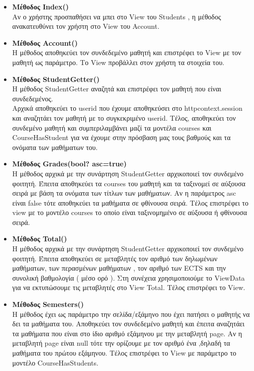 \documentclass[12pt]{article}
\begin{document}
\begin{itemize}
	
	\item \textbf{Μέθοδος Index()}\\				
	Αν ο χρήστης προσπαθήσει να μπει στο View του Students , η μέθοδος ανακατευθύνει τον χρήστη στο View του Account.
	
	\item	\textbf{Μέθοδος Account()}\\
	Η μέθοδος αποθηκεύει τον συνδεδεμένο μαθητή και επιστρέφει το View με τον μαθητή ως παράμετρο. Το View προβάλλει στον χρήστη τα στοιχεία του.
	
	\item \textbf{Μέθοδος StudentGetter()}\\		
	Η μέθοδος StudentGetter αναζητά και επιστρέφει τον μαθητή που είναι συνδεδεμένος.\\
	Αρχικά αποθηκεύει το userid που έχουμε αποθηκεύσει στο httpcontext.session και αναζητάει τον μαθητή με το συγκεκριμένο userid. Τέλος, αποθηκεύει τον συνδεμένο μαθητή και συμπεριλαμβάνει μαζί τα μοντέλα courses και CourseHasStudent για να έχουμε στην πρόσβαση μας τους βαθμούς και τα ονόματα των μαθήματων του.

	\item \textbf{Μέθοδος Grades(bool? asc=true)}\\
	Η μέθοδος αρχικά με την συνάρτηση StudentGetter αρχικοποιεί τον συνδεμένο φοιτητή. Έπειτα αποθηκεύει τα courses του μαθητή και τα ταξινομεί σε αύξουσα σειρά με βάση τα ονόματα των τίτλων των μαθήματων. Αν η παράμετρος asc είναι false τότε αποθηκεύει τα μαθήματα σε φθίνουσα σειρά. Τέλος επιστρέφει το view με το μοντέλο courses το οποίο είναι ταξινομημένο σε αύξουσα ή φθίνουσα σειρά.
		
	\item \textbf{Μέθοδος Total()}\\
	Η μέθοδος αρχικά με την συνάρτηση StudentGetter αρχικοποιεί τον συνδεμένο φοιτητή. Έπειτα αποθηκεύει σε μεταβλητές τον αριθμό των δηλωμένων μαθήματων, των περασμένων μαθήματων , τον αριθμό των ECTS και την συνολική βαθμολογία ( μέσο ορό ). Στη συνέχεια χρησιμοποιούμε το ViewData για να εκτυπώσουμε τις μεταβλητές στο View Total. Τέλος επιστρέφει το View.
	
	\item \textbf{Μέθοδος Semesters()}\\
	Η μέθοδος έχει ως παράμετρο την σελίδα/εξάμηνο που έχει πατήσει ο μαθητής να δει τα μαθήματα του. Αποθηκεύει τον συνδεδεμένο μαθητή και έπειτα αναζητάει τα μαθήματα που είναι στο ίδιο αριθμό εξάμηνου με την μεταβλητή page. Αν η μεταβλητή page είναι null τότε την ορίζουμε με τον αριθμό ένα ,δηλαδή τα μαθήματα του πρώτου εξάμηνου. Τέλος επιστρέφει το View με παράμετρο το μοντέλο CourseHasStudents.
	
\end{itemize}
\end{document}
